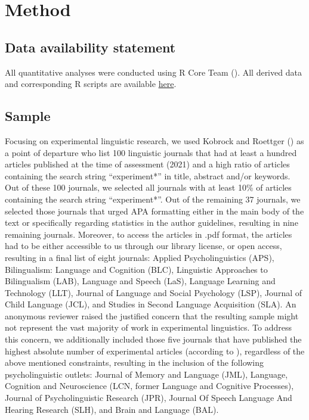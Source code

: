 \documentclass[
  doc,
  longtable,
  nolmodern,
  notxfonts,
  notimes,
  colorlinks=true,linkcolor=blue,citecolor=blue,urlcolor=blue]{apa7}
\begin{document}
\section{Method}\label{method}

\subsection{Data availability
statement}\label{data-availability-statement}

All quantitative analyses were conducted using R Core Team
(). All derived data and corresponding R
scripts are available
\href{https://osf.io/gx3ub/?view_only=25957e06b5f449d6820b529eb0ae1937}{here}.

\subsection{Sample}\label{sample}

Focusing on experimental linguistic research, we used Kobrock and
Roettger () as a point of
departure who list 100 linguistic journals that had at least a hundred
articles published at the time of assessment (2021) and a high ratio of
articles containing the search string ``experiment*'' in title, abstract
and/or keywords. Out of these 100 journals, we selected all journals
with at least 10\% of articles containing the search string
``experiment*''. Out of the remaining 37 journals, we selected those
journals that urged APA formatting either in the main body of the text
or specifically regarding statistics in the author guidelines, resulting
in nine remaining journals. Moreover, to access the articles in .pdf
format, the articles had to be either accessible to us through our
library license, or open access, resulting in a final list of eight
journals: Applied Psycholinguistics (APS), Bilingualism: Language and
Cognition (BLC), Linguistic Approaches to Bilingualism (LAB), Language
and Speech (LaS), Language Learning and Technology (LLT), Journal of
Language and Social Psychology (LSP), Journal of Child Language (JCL),
and Studies in Second Language Acquisition (SLA). An anonymous reviewer
raised the justified concern that the resulting sample might not
represent the vast majority of work in experimental linguistics. To
address this concern, we additionally included those five journals that
have published the highest absolute number of experimental articles
(according to ), regardless of the above mentioned constraints, resulting in the
inclusion of the following psycholinguistic outlets: Journal of Memory
and Language (JML), Language, Cognition and Neuroscience (LCN, former
Language and Cognitive Processes), Journal of Psycholinguistic Research
(JPR), Journal Of Speech Language And Hearing Research (SLH), and Brain
and Language (BAL).
\end{document}
